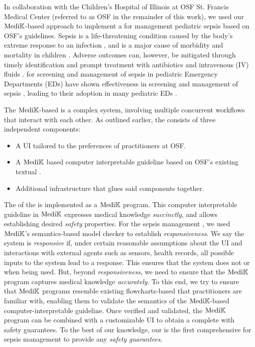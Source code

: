 In collaboration with the Children's Hospital of Illinois at
OSF St. Francis Medical Center (referred to as OSF in the remainder of this
work), we used our $\text{Medi}\mathbb{K}{}$-based approach  to implement a \CDSS{} for management pediatric sepsis
based on OSF's guidelines.
Sepsis is a life-threatening condition caused by the body's extreme response to
an infection \cite{RhodesICM17}, and is
a major cause of morbidity and mortality in children \cite{Eisenberg2021JP}.
Adverse outcomes can, however, be mitigated through timely
identification and prompt treatment with antibiotics and
intravenous (IV) fluids \cite{Weiss2014CCM,Evans2018JAMA}.
\BPGs{} for screening and management of sepsis in pediatric Emergency
Departments (EDs) have shown effectiveness in screening and management of sepsis \cite{Eisenberg2021JP},
leading to their adoption in many pediatric EDs \cite{Balamuth2017EM,Sepanski2014FP}.

The $\text{Medi}\mathbb{K}{}$-based \CDSS{} is a complex system, involving multiple
concurrent workflows that interact with each other. As outlined earlier,
the \CDSS{} consists of three independent components:
\begin{itemize}
  \itemsep0.0em
  \item A UI tailored to the preferences of practitioners at OSF.
  \item A $\text{Medi}\mathbb{K}{}{}$ based computer interpretable guideline based on OSF's
    existing textual \BPG{}.
  \item Additional infrastructure that glues said components together.
\end{itemize}

The \BPGLogic{} of the \CDSS{} is implemented as a $\text{Medi}\mathbb{K}{}{}$ program.
This computer interpretable guideline in $\text{Medi}\mathbb{K}{}$ expresses
medical knowledge \emph{succinctly}, and allows establishing desired \emph{safety} properties.
For the sepsis management \CDSS{}, we used $\text{Medi}\mathbb{K}{}{}$'s semantics-based model checker to
establish \emph{responsiveness}. We say the system is \emph{responsive} if,
under certain reasonable assumptions about the UI and interactions with external
agents such as sensors, health records, all possible inputs to the
system lead to a response. This ensures that the system does not
 or  when being used. But, beyond \emph{responsiveness},
we need to ensure that the $\text{Medi}\mathbb{K}{}{}$ program captures medical knowledge \emph{accurately}.
To this end, we try to ensure that $\text{Medi}\mathbb{K}{}{}$ programs resemble
existing flowcharts-based \BPGs{} that practitioners are familiar with,
enabling them to validate the semantics of the $\text{Medi}\mathbb{K}{}{}$-based
computer-interpretable guideline. Once verified and validated, the $\text{Medi}\mathbb{K}{}{}$ program
can be combined with a customizable UI to obtain a complete \CDSS{} with
safety guarantees. To the best of our knowledge, our is the first
comprehensive \CDSSs{} for sepsis management to provide any \emph{safety
guarantees}.

